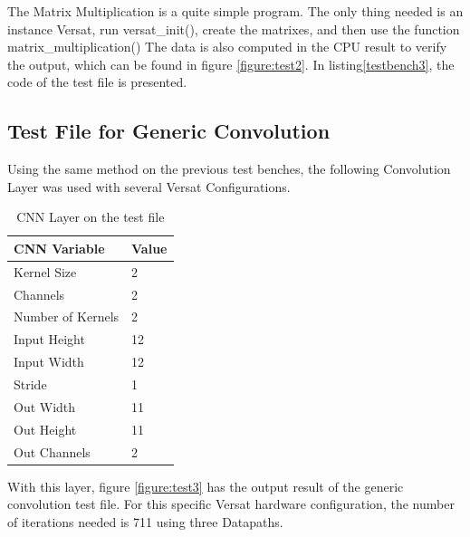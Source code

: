The Matrix Multiplication is a quite simple program. The only thing needed is an instance
Versat, run versat\_init(), create the matrixes, and then use the function matrix\_multiplication()
The data is also computed in the CPU result to verify the output, which can be found in
figure \ref{figure:test2}. In listing\ref{testbench3}, the code of the test file is presented.




\subsection{Test File for Generic Convolution}

Using the same method on the previous test benches, the following Convolution Layer was used
with several Versat Configurations.

\begin{table}[!htpb]
    \centering
    \begin{tabular}{ll}
    \hline
    \textbf{CNN Variable} & \textbf{Value}        \\ \hline
    Kernel Size            & 2                 \\
    Channels            & 2                       \\
    Number of Kernels            & 2                       \\
    Input Height                  & 12                        \\
    Input Width                & 12                  \\
    Stride              & 1                     \\
    Out Width               & 11                      \\
    Out Height            & 11  \\
    Out Channels                   & 2                     \\ \hline
    \end{tabular}
    \label{table:convInput}
    \caption{CNN Layer on the test file}
\end{table}

With this layer, figure \ref{figure:test3} has the output result of the generic convolution test file.
For this specific Versat hardware configuration, the number of iterations needed is 711 using three  Datapaths.

